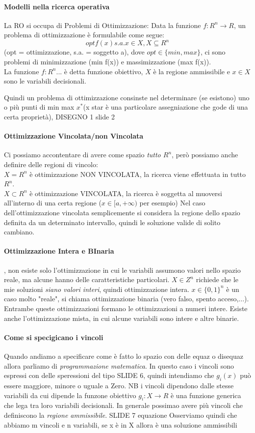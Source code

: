 \documentclass[12pt, a4paper, openany]{book}
\begin{document}
\paragraph*{Modelli nella ricerca operativa} La RO si occupa di Problemi di Ottimizzazione:
Data la funzione $f:R^n \to R$, un problema di ottimizzazione è formulabile come segue:
$$opt f(x) s.a. x\in X, X\subseteq R^n$$ 
(opt = ottimizzazione, s.a. = soggetto a), 
dove $opt \in \{min,max\}$, 
ci sono problemi di minimizzazione (min f(x)) e massimizzazione (max f(x)).
\\La funzione $f:R^n...$ è detta funzione obiettivo, $X$ è la regione ammissibile e $x\in X$ sono le variabili decisionali.

Quindi un problema di ottimizzazione consinste nel determinare (se esistono) uno o più punti di min max $x^*$(x star è una particolare assegniazione che gode di una certa proprietà),
{DISEGNO 1 slide 2}
\paragraph*{Ottimizzazione Vincolata/non Vincolata} Ci possiamo accontentare di avere come spazio \emph{tutto $R^n$}, però possiamo anche definire delle regioni di vincolo:
\\$X=R^n$ è ottimizzazione NON VINCOLATA, la ricerca viene effettuata in tutto $R^n$.
\\$X\subset R^n$ è ottimizzazione VINCOLATA, la ricerca è soggetta al muoversi all'interno di una certa regione ($x \in [a, +\infty)$ per esempio)
Nel caso dell'ottimizzazione vincolata semplicemente si considera la regione dello spazio definita da un determinato intervallo, quindi le soluzione valide di solito cambiano.
\paragraph*{Ottimizzazione Intera e BInaria}, non esiste solo l'ottimizzazione in cui le variabili assumono valori nello spazio reale, ma alcune hanno delle caratteristiche particolari.
$X\in Z^n$ richiede che le mie soluzioni \emph{siano valori interi}, quindi ottimizzazione intera.
$x\in \{0,1\}^n$ è un caso molto "reale", si chiama ottimizzazione binaria (vero falso, spento acceso,...). Entrambe queste ottimizzazioni formano le ottimizzazioni a numeri intere.
Esiste anche l'ottimizzazione mista, in cui alcune variabili sono intere e altre binarie.
\paragraph*{Come si specigicano i vincoli} Quando andiamo a specificare come è fatto lo spazio con delle equaz o disequaz allora parliamo di \emph{programmazione matematica}.
In questo caso i vincoli sono espressi con delle speressioni del tipo {SLIDE 6}, quindi intendiamo che $g_i(x)$ può essere maggiore, minore o uguale a Zero. NB i vincoli dipendono dalle stesse variabili da cui dipende la funzone obiettivo 
$g_i :X\to R$ è una funzione generica che lega tra loro variabili decisionali. In generale possimao avere più vincoli che definiscono la \emph{regione ammissibile}.
{SLIDE 7 equazione }Osserviamo quindi che abbiamo m vincoli e n variabili, se x è in X allora è una soluzione ammissibili
\end{document}
